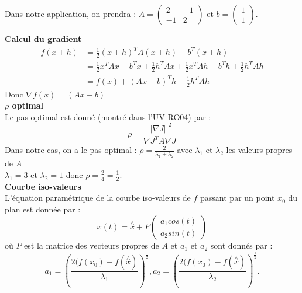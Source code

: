 \documentclass[a4paper,10pt]{report}
\begin{document}
Dans notre application, on prendra : $A = \left( \begin{array}{cc} 2 & -1 \\ -1 & 2 \end{array} \right)$ et $b=\left( \begin{array}{c} 1 \\ 1 \end{array} \right)$.

\textbf{Calcul du gradient}\\
\begin{align*}
f(x+h) & = \frac{1}{2}(x+h)^TA(x+h) - b^T(x+h) \\
	   & = \frac{1}{2}x^TAx - b^Tx + \frac{1}{2}h^TAx + \frac{1}{2}x^TAh -b^Th + \frac{1}{2}h^TAh \\
	   & = f(x) + (Ax-b)^Th + \frac{1}{2}h^TAh
\end{align*}
Donc $\nabla f(x) = (Ax-b)$ \\

\textbf{$\rho$ optimal}\\
Le pas optimal est donné (montré dans l'UV RO04) par :
\abovedisplayskip=0mm
\begin{displaymath}
\rho = \frac{||\nabla J||^2}{\nabla J^TA\nabla J}
\end{displaymath}
Dans notre cas, on a le pas optimal : $\rho = \frac{2}{\lambda_1 + \lambda_2}$ avec $\lambda_1$ et $\lambda_2$ les valeurs propres de $A$ \\
$\lambda_1 = 3$ et $\lambda_2 = 1$ donc $\rho=\frac{2}{4}=\frac{1}{2}$. \\

\textbf{Courbe iso-valeurs}\\
L'équation paramétrique de la courbe iso-valeurs de $f$ passant par un point $x_0$ du plan est donnée par :
\abovedisplayskip=0mm
\begin{displaymath}
x(t)= \overset{\wedge}{x} + P\left( \begin{array}{c} a_1cos(t) \\ a_2sin(t) \end{array} \right)
\end{displaymath}
où $P$ est la matrice des vecteurs propres de $A$ et $a_1$ et $a_2$ sont donnés par :
\abovedisplayskip=0mm
\begin{displaymath}
a_1= \left( \frac{2(f(x_0)-f(\overset{\wedge}{x})}{\lambda_1} \right)^\frac{1}{2}, a_2= \left( \frac{2(f(x_0)-f(\overset{\wedge}{x})}{\lambda_2} \right)^\frac{1}{2}.
\end{displaymath}
\\
\end{document}
